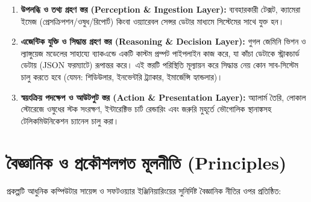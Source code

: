 \documentclass[12pt,a4paper,oneside]{report}
\begin{document}
\begin{enumerate}
    \item \textbf{উপলব্ধি ও তথ্য গ্রহণ স্তর (Perception \& Ingestion Layer):} ব্যবহারকারী টেক্সট, ক্যামেরা ইমেজ (প্রেসক্রিপশন/ওষুধ/রিপোর্ট) কিংবা ওয়্যারেবল সেন্সর ডেটার মাধ্যমে সিস্টেমের সাথে যুক্ত হন।
    \item \textbf{এজেন্টিক যুক্তি ও সিদ্ধান্ত গ্রহণ স্তর (Reasoning \& Decision Layer):} গুগল জেমিনি ভিশন ও ল্যাঙ্গুয়েজ মডেলের সাহায্যে ব্যাকএন্ডে একটি কাস্টম প্রম্পট পাইপলাইন কাজ করে, যা কাঁচা ডেটাকে স্ট্রাকচার্ড ডেটায় (JSON ফরম্যাটে) রূপান্তর করে। এই স্তরটি পরিস্থিতি মূল্যায়ন করে সিদ্ধান্ত নেয় কোন সাব-সিস্টেম চালু করতে হবে (যেমন: শিডিউলার, ইনভেন্টরি ট্র্যাকার, ইমার্জেন্সি হ্যান্ডলার)।
    \item \textbf{স্বয়ংক্রিয় পদক্ষেপ ও আউটপুট স্তর (Action \& Presentation Layer):} অ্যালার্ম তৈরি, লোকাল স্টোরেজে ওষুধের স্টক সংরক্ষণ, ইন্টারেক্টিভ চার্ট রেন্ডারিং এবং জরুরি মুহূর্তে ভৌগোলিক স্থানাঙ্কসহ টেলিকমিউনিকেশন চ্যানেল চালু করা।
\end{enumerate}

\chapter{বৈজ্ঞানিক ও প্রকৌশলগত মূলনীতি (Principles)}

প্রকল্পটি আধুনিক কম্পিউটার সায়েন্স ও সফটওয়্যার ইঞ্জিনিয়ারিংয়ের সুনির্দিষ্ট বৈজ্ঞানিক নীতির ওপর প্রতিষ্ঠিত:
\end{document}
